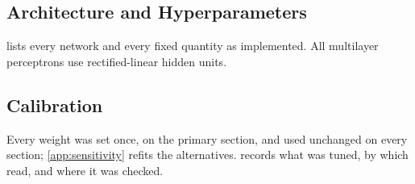 
\subsection{Architecture and Hyperparameters}
\label{app:architecture}

 lists every network and every fixed quantity as implemented. All multilayer perceptrons use rectified-linear hidden units.



\subsection{Calibration}
\label{app:S-calibration}

Every weight was set once, on the primary section, and used unchanged on every section; \cref{app:sensitivity} refits the alternatives.  records what was tuned, by which read, and where it was checked.

